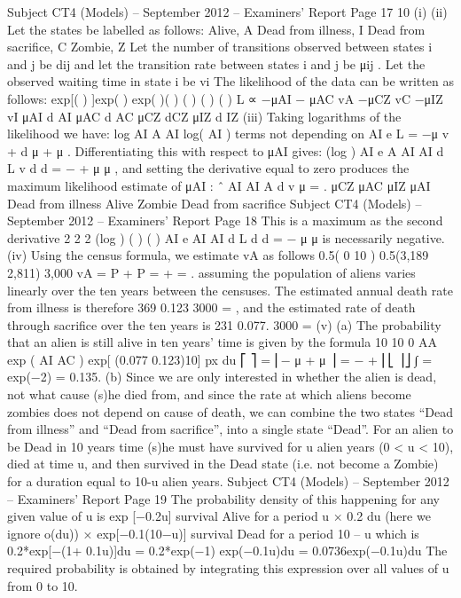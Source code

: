 Subject CT4 (Models) – September 2012 – Examiners’ Report
Page 17
10
(i)
(ii) Let the states be labelled as follows:
Alive, A
Dead from illness, I
Dead from sacrifice, C
Zombie, Z
Let the number of transitions observed between states i and j be dij
and let the transition rate between states i and j be μij .
Let the observed waiting time in state i be vi
The likelihood of the data can be written as follows:
exp[( ) ]exp( ) exp( )( ) ( ) ( ) ( ) L ∝ −μAI − μAC vA −μCZ vC −μIZ vI μAI d AI μAC d AC μCZ dCZ μIZ d IZ
(iii) Taking logarithms of the likelihood we have:
log AI A AI log( AI ) terms not depending on AI
e L = −μ v + d μ + μ .
Differentiating this with respect to μAI gives:
(log ) AI
e A
AI AI
d L v d
d
= − +
μ μ
,
and setting the derivative equal to zero produces the maximum likelihood estimate of
μAI :
ˆ
AI
AI
A
d
v
μ = .
μCZ
μAC μIZ
μAI
Dead from illness
Alive
Zombie
Dead from sacrifice
Subject CT4 (Models) – September 2012 – Examiners’ Report
Page 18
This is a maximum as the second derivative
2
2 2
(log )
( ) ( )
AI
e
AI AI
d L d
d
= −
μ μ
is necessarily negative.
(iv) Using the census formula, we estimate vA as follows
0.5( 0 10 ) 0.5(3,189 2,811) 3,000 vA = P + P = + = .
assuming the population of aliens varies linearly over the ten years between the
censuses.
The estimated annual death rate from illness is therefore
369 0.123
3000
= ,
and the estimated rate of death through sacrifice over the ten years is
231 0.077.
3000
=
(v) (a) The probability that an alien is still alive in ten years’ time
is given by the formula
10
10
0
AA exp ( AI AC ) exp[ (0.077 0.123)10]
px du
⎡ ⎤
= ⎢− μ + μ ⎥ = − +
⎢⎣ ⎥⎦
∫
= exp(−2) = 0.135.
(b) Since we are only interested in whether the alien is dead, not what cause (s)he
died from,
and since the rate at which aliens become zombies does not depend on cause
of death, we can combine the two states “Dead from illness” and “Dead from
sacrifice”, into a single state “Dead”.
For an alien to be Dead in 10 years time (s)he must have survived for u
alien years (0 < u < 10), died at time u, and then survived in the Dead state (i.e.
not become a Zombie) for a duration equal to 10-u alien years.
Subject CT4 (Models) – September 2012 – Examiners’ Report
Page 19
The probability density of this happening for any given value of u is
exp [−0.2u] survival Alive for a period u
×
0.2 du (here we ignore o(du))
×
exp[−0.1(10−u)] survival Dead for a period 10 – u
which is
0.2*exp[−(1+ 0.1u)]du = 0.2*exp(−1) exp(−0.1u)du
= 0.0736exp(−0.1u)du
The required probability is obtained by integrating this expression over
all values of u from 0 to 10.
